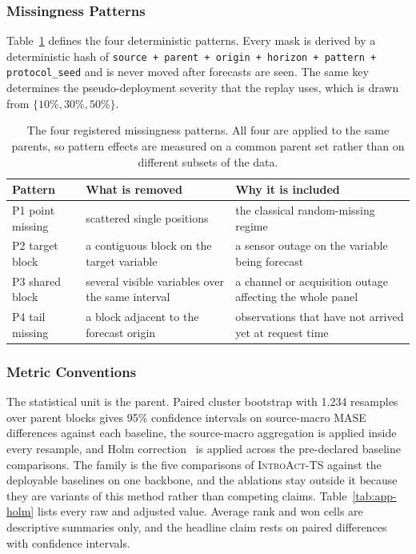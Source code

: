 \documentclass{article}
\newcommand{\introact}{\textsc{IntroAct-TS}}
\begin{document}
\subsubsection{Missingness Patterns}
\label{app:patterns}
Table~\ref{tab:app-patterns} defines the four deterministic patterns. Every mask is derived
by a deterministic hash of
\texttt{source + parent + origin + horizon + pattern + protocol\_seed} and is never moved
after forecasts are seen. The same key determines the pseudo-deployment severity that the
replay uses, which is drawn from $\{10\%, 30\%, 50\%\}$.

\begin{table}[h]
  \caption{The four registered missingness patterns. All four are applied to the same parents,
  so pattern effects are measured on a common parent set rather than on different subsets of
  the data.}
  \label{tab:app-patterns}
  \centering
  \small
  \setlength{\tabcolsep}{4pt}
\begin{tabular}{@{}l p{} p{}@{}}
    \toprule
    Pattern & What is removed & Why it is included \\
    \midrule
    P1 point missing    & scattered single positions & the classical random-missing regime \\
    P2 target block     & a contiguous block on the target variable & a sensor outage on the variable being forecast \\
    P3 shared block     & several visible variables over the same interval & a channel or acquisition outage affecting the whole panel \\
    P4 tail missing     & a block adjacent to the forecast origin & observations that have not arrived yet at request time \\
    \bottomrule
  \end{tabular}
\end{table}

\subsubsection{Metric Conventions}
\label{app:metric-conventions}
The statistical unit is the parent. Paired cluster bootstrap with 1.234 resamples
over parent blocks gives 95\% confidence intervals on source-macro MASE differences against
each baseline, the source-macro aggregation is applied inside every resample, and Holm
correction~\citep{holm1979simple} is applied across the pre-declared baseline comparisons.
The family is the five comparisons of \introact{} against the deployable baselines on one
backbone, and the ablations stay outside it because they are variants of this method rather
than competing claims. Table~\ref{tab:app-holm} lists every raw and adjusted value.
Average rank and won cells are descriptive summaries only, and the headline claim rests on
paired differences with confidence intervals.
\end{document}
